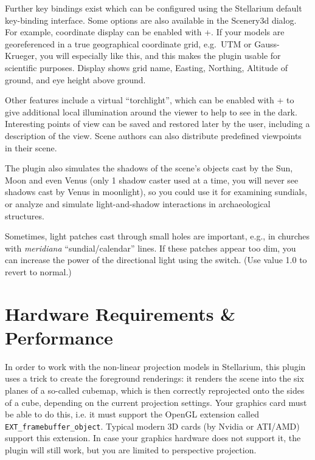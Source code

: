 Further key bindings exist which can be configured using the Stellarium default
key-binding interface. Some options are also available in the Scenery3d dialog.
For example, coordinate display can be enabled with +. If your models are georeferenced
in a true geographical coordinate grid, e.g.\ UTM or Gauss-Krueger, you will
especially like this, and this makes the plugin usable for scientific purposes.
Display shows grid name, Easting, Northing, Altitude of ground, and eye height
above ground.

Other features include a virtual ``torchlight'', which can be enabled with + to give
additional local illumination around the viewer to help to see in the dark.
Interesting points of view can be saved and restored later by the user,
including a description of the view. Scene authors can also distribute
predefined viewpoints in their scene.

The plugin also simulates the shadows of the scene's objects cast by
the Sun, Moon and even Venus (only 1 shadow caster used at a time, you
will never see shadows cast by Venus in moonlight), so you could use
it for examining sundials, or analyze and simulate light-and-shadow
interactions in archaeological structures.

Sometimes,  light patches cast through small holes are important, e.g., 
in churches with \emph{meridiana} ``sundial/calendar'' lines. If these patches 
appear too dim, you can increase the power of the directional light using the 
 switch. (Use value 1.0 to revert to normal.) 

\section{Hardware Requirements \& Performance}
\label{sec:scenery3d:HardwareRequirements}

In order to work with the non-linear projection models in Stellarium,
this plugin uses a trick to create the foreground renderings: it
renders the scene into the six planes of a so-called cubemap, which is
then correctly reprojected onto the sides of a cube, depending on the
current projection settings. Your graphics card must be able to do
this, i.e. it must support the OpenGL extension called
\texttt{EXT\_framebuffer\_object}. Typical modern 3D cards (by Nvidia
or ATI/AMD) support this extension. In case your graphics hardware
does not support it, the plugin will still work, but you are limited
to perspective projection.

